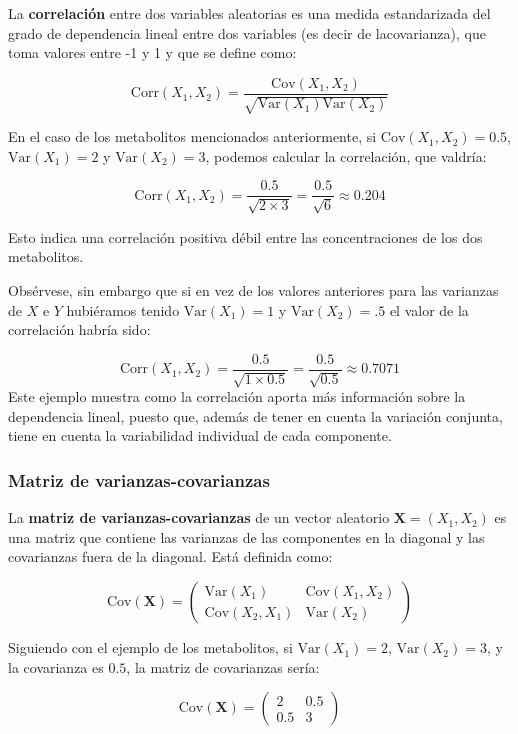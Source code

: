 \documentclass[
]{article}
\begin{document}
La \textbf{correlación} entre dos variables aleatorias es una medida estandarizada del grado de dependencia lineal entre dos variables (es decir de lacovarianza), que toma valores entre -1 y 1 y que se define como:

\[
\text{Corr}(X_1,X_2)=\frac{\text{Cov}(X_1,X_2)}{\sqrt{\text{Var}(X_1)\text{Var}(X_2)}}
\]

En el caso de los metabolitos mencionados anteriormente, si \(\text{Cov}(X_1,X_2)=0.5\), \(\text{Var}(X_1)=2\) y \(\text{Var}(X_2)=3\), podemos calcular la correlación, que valdría:

\[
\text{Corr}(X_1,X_2)=\frac{0.5}{\sqrt{2\times 3}}=\frac{0.5}{\sqrt{6}}\approx 0.204
\]

Esto indica una correlación positiva débil entre las concentraciones de los dos metabolitos.

Obsérvese, sin embargo que si en vez de los valores anteriores para las varianzas de \(X\) e \(Y\) hubiéramos tenido \(\text{Var}(X_1)=1\) y \(\text{Var}(X_2)=.5\) el valor de la correlación habría sido:

\[
\text{Corr}(X_1,X_2)=\frac{0.5}{\sqrt{1\times 0.5}}=\frac{0.5}{\sqrt{0.5}}\approx 0.7071
\]
Este ejemplo muestra como la correlación aporta más información sobre la dependencia lineal, puesto que, además de tener en cuenta la variación conjunta, tiene en cuenta la variabilidad individual de cada componente.

\subsubsection{Matriz de varianzas-covarianzas}\label{matriz-de-varianzas-covarianzas}

La \textbf{matriz de varianzas-covarianzas} de un vector aleatorio \(\mathbf{X}=(X_1,X_2)\) es una matriz que contiene las varianzas de las componentes en la diagonal y las covarianzas fuera de la diagonal. Está definida como:

\[
\text{Cov}(\mathbf{X})=
\begin{pmatrix}
\text{Var}(X_1)&\text{Cov}(X_1,X_2)\\
\text{Cov}(X_2,X_1)&\text{Var}(X_2)
\end{pmatrix}
\]

Siguiendo con el ejemplo de los metabolitos, si \(\text{Var}(X_1)=2\), \(\text{Var}(X_2)=3\), y la covarianza es \(0.5\), la matriz de covarianzas sería:

\[
\text{Cov}(\mathbf{X})=
\begin{pmatrix}
2&0.5\\
0.5&3
\end{pmatrix}
\]
\end{document}
